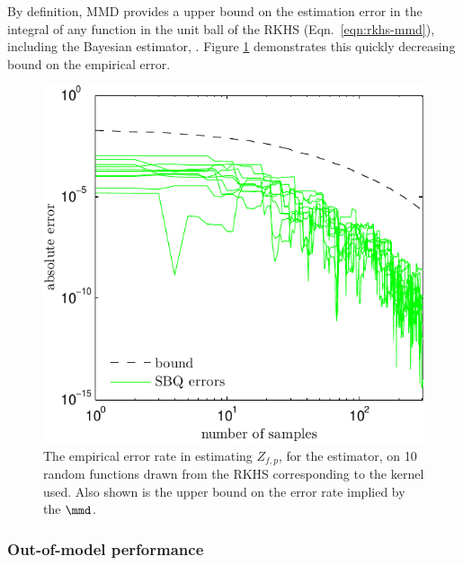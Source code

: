 By definition, MMD provides a upper bound on the estimation error in the integral of any function in the unit ball of the RKHS (Eqn.\ \eqref{eqn:rkhs-mmd}), including the Bayesian estimator, \sbq{}. Figure \ref{fig:bound_curve} demonstrates this quickly decreasing bound on the \sbq{} empirical error.

\begin{figure}
\includegraphics[width=\columnwidth]{figs/herding/bound_curve_rkhs}
\caption[Illustrating MMD as an upper bound on empirical error rate]{The empirical error rate in estimating $Z_{f,p}$,  for the \sbq{} estimator, on 10 random functions drawn from the RKHS corresponding to the kernel used.  Also shown is the upper bound on the error rate implied by the $\mmd$.}
\label{fig:bound_curve}
\end{figure}

\subsubsection{Out-of-model performance}

